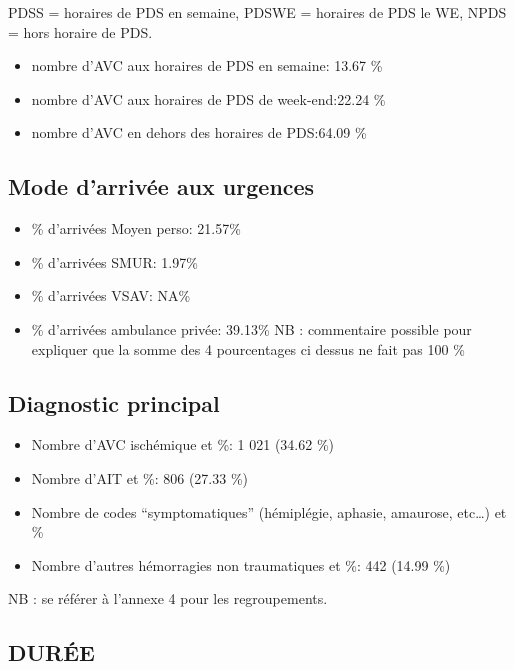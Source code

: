 \documentclass[]{article}
\begin{document}
PDSS = horaires de PDS en semaine, PDSWE = horaires de PDS le WE, NPDS =
hors horaire de PDS.

\begin{itemize}
\itemsep1pt\parskip0pt
\item
  nombre d'AVC aux horaires de PDS en semaine: 13.67 \%
\item
  nombre d'AVC aux horaires de PDS de week-end:22.24 \%
\item
  nombre d'AVC en dehors des horaires de PDS:64.09 \%
\end{itemize}

\subsection{Mode d'arrivée aux
urgences}\label{mode-darrivee-aux-urgences}

\begin{itemize}
\itemsep1pt\parskip0pt
\item
  \% d'arrivées Moyen perso: 21.57\%
\item
  \% d'arrivées SMUR: 1.97\%
\item
  \% d'arrivées VSAV: NA\%
\item
  \% d'arrivées ambulance privée: 39.13\% NB : commentaire possible pour
  expliquer que la somme des 4 pourcentages ci dessus ne fait pas 100 \%
\end{itemize}

\subsection{Diagnostic principal}\label{diagnostic-principal-1}

\begin{itemize}
\itemsep1pt\parskip0pt
\item
  Nombre d'AVC ischémique et \%: 1 021 (34.62 \%)
\item
  Nombre d'AIT et \%: 806 (27.33 \%)
\item
  Nombre de codes ``symptomatiques'' (hémiplégie, aphasie, amaurose,
  etc\ldots{}) et \%
\item
  Nombre d'autres hémorragies non traumatiques et \%: 442 (14.99 \%)
\end{itemize}

NB : se référer à l'annexe 4 pour les regroupements.

\subsection{DURÉE}\label{duree-1}
\end{document}
